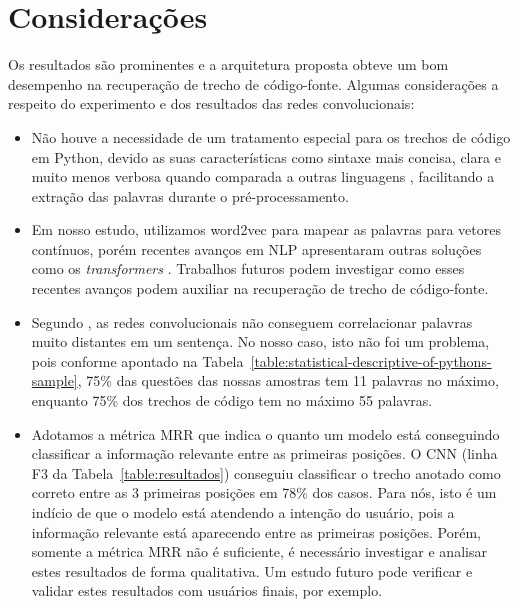 \section{Considerações}
\label{sec:consideracoes-resultados}

Os resultados são prominentes e a arquitetura proposta obteve um bom desempenho na recuperação de trecho de código-fonte. Algumas considerações a respeito do experimento e dos resultados das redes convolucionais:

\begin{itemize}
    \item Não houve a necessidade de um tratamento especial para os trechos de código em Python, devido as suas características como sintaxe mais concisa, clara e muito menos verbosa quando comparada a outras linguagens \citep{theodora-introductory-programming-python-2015}, facilitando a extração das palavras durante o pré-processamento. 
    
    \item Em nosso estudo, utilizamos \gls{word2vec} para mapear as palavras para vetores contínuos, porém recentes avanços em NLP apresentaram outras soluções como os \textit{transformers} \citep{attention-is-all-you-need-2017}. Trabalhos futuros podem investigar como esses recentes avanços podem auxiliar na recuperação de trecho de código-fonte.
    
    \item Segundo \cite{Goodfellow-et-al-2016}, as redes convolucionais não conseguem correlacionar palavras muito distantes em um sentença. No nosso caso, isto não foi um problema, pois conforme apontado na Tabela~\ref{table:statistical-descriptive-of-pythons-sample}, 75\% das questões das nossas amostras tem 11 palavras no máximo, enquanto 75\% dos trechos de código tem no máximo 55 palavras.
    
    \item Adotamos a métrica MRR que indica o quanto um modelo está conseguindo classificar a informação relevante entre as primeiras posições. O CNN (linha F3 da Tabela~\ref{table:resultados}) conseguiu classificar o trecho anotado como correto entre as 3 primeiras posições em 78\% dos casos. Para nós, isto é um indício de que o modelo está atendendo a intenção do usuário, pois a informação relevante está aparecendo entre as primeiras posições. Porém, somente a métrica MRR não é suficiente, é necessário investigar e analisar estes resultados de forma qualitativa. Um estudo futuro pode verificar e validar estes resultados com usuários finais, por exemplo. 
\end{itemize}


